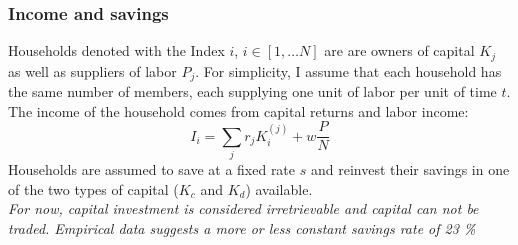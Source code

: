 \subsubsection{Income and savings}
Households denoted with the Index $i$, $i \in [1, \dots N]$ are are owners of capital $K_j$ as well as suppliers of labor $P_j$. For simplicity, I assume that each household has the same number of members, each supplying one unit of labor per unit of time $t$. The income of the household comes from capital returns and labor income:
\begin{equation}
	I_i = \sum_j r_j K^{(j)}_{i} + w\frac{P}{N}
	\label{eq:household_income}
\end{equation}
Households are assumed to save at a fixed rate $s$ and reinvest their savings in one of the two types of capital ($K_c$ and $K_d$) available. \\
\textit{For now, capital investment is considered irretrievable and capital can not be traded. Empirical data suggests a more or less constant savings rate of 23 \%} \\

